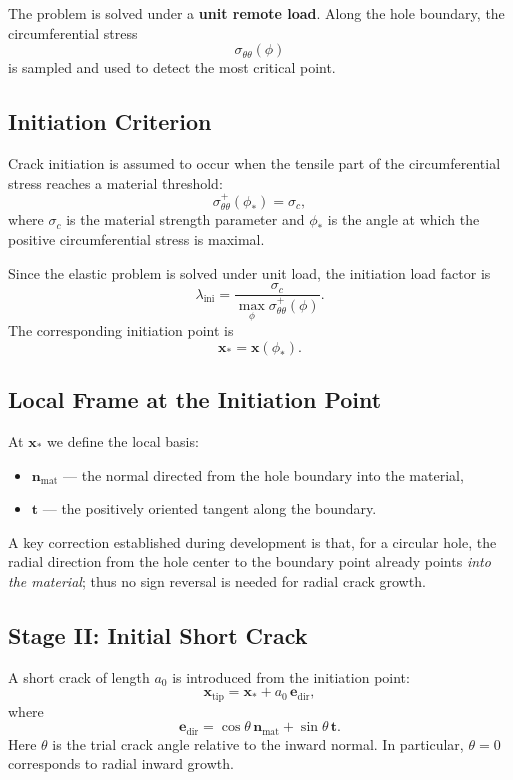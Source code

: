 \documentclass[11pt]{article}
\begin{document}
	The problem is solved under a \textbf{unit remote load}. Along the hole boundary, the circumferential stress
	\[
	\sigma_{\theta\theta}(\phi)
	\]
	is sampled and used to detect the most critical point.
	
	\subsection{Initiation Criterion}
	
	Crack initiation is assumed to occur when the tensile part of the circumferential stress reaches a material threshold:
	\[
	\sigma_{\theta\theta}^{+}(\phi_*) = \sigma_c,
	\]
	where $\sigma_c$ is the material strength parameter and $\phi_*$ is the angle at which the positive circumferential stress is maximal.
	
	Since the elastic problem is solved under unit load, the initiation load factor is
	\[
	\lambda_{\mathrm{ini}} = \frac{\sigma_c}{\max_{\phi}\sigma_{\theta\theta}^{+}(\phi)}.
	\]
	The corresponding initiation point is
	\[
	\bm{x}_* = \bm{x}(\phi_*).
	\]
	
	\subsection{Local Frame at the Initiation Point}
	
	At $\bm{x}_*$ we define the local basis:
	\begin{itemize}
		\item $\bm{n}_{\mathrm{mat}}$ --- the normal directed from the hole boundary into the material,
		\item $\bm{t}$ --- the positively oriented tangent along the boundary.
	\end{itemize}
	
	A key correction established during development is that, for a circular hole, the radial direction from the hole center to the boundary point already points \emph{into the material}; thus no sign reversal is needed for radial crack growth.
	
	\subsection{Stage II: Initial Short Crack}
	
	A short crack of length $a_0$ is introduced from the initiation point:
	\[
	\bm{x}_{\mathrm{tip}} = \bm{x}_* + a_0\,\bm{e}_{\mathrm{dir}},
	\]
	where
	\[
	\bm{e}_{\mathrm{dir}} = \cos\theta\,\bm{n}_{\mathrm{mat}} + \sin\theta\,\bm{t}.
	\]
	Here $\theta$ is the trial crack angle relative to the inward normal. In particular, $\theta=0$ corresponds to radial inward growth.
	
\end{document}
